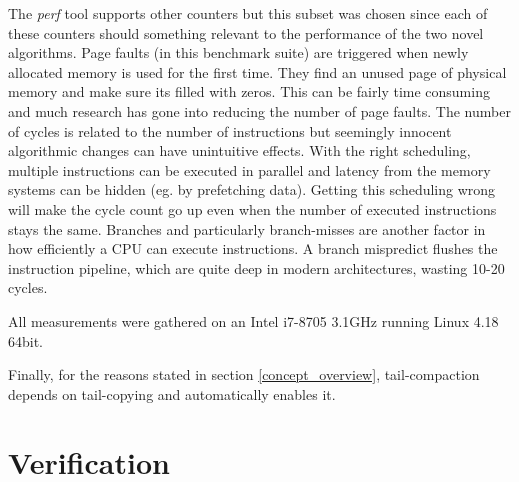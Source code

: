 \documentclass[a4paper,oneside]{memoir}
\begin{document}
The \emph{perf} tool supports other counters but this subset was chosen since
each of these counters should something relevant to the performance of the two
novel algorithms. Page faults (in this benchmark suite) are triggered when newly
allocated memory is used for the first time. They find an unused page of physical
memory and make sure its filled with zeros. This can be fairly time consuming
and much research has gone into reducing the number of page faults.\cite{Nakashima:1995,Chase:1987,Moon:1984,Grunwald:1993}
The number of cycles is related to the number of instructions but seemingly
innocent algorithmic changes can have unintuitive effects. With the right
scheduling, multiple instructions can be executed in parallel and latency from
the memory systems can be hidden (eg. by prefetching data). Getting this scheduling
wrong will make the cycle count go up even when the number of executed instructions
stays the same. Branches and particularly branch-misses are another factor in
how efficiently a CPU can execute instructions. A branch mispredict flushes the
instruction pipeline, which are quite deep in modern architectures, wasting
10-20 cycles.\cite{Drepper}

All measurements were gathered on an Intel i7-8705 3.1GHz running Linux 4.18 64bit.

Finally, for the reasons stated in section \ref{concept_overview}, tail-compaction
depends on tail-copying and automatically enables it.

\section{Verification}
\end{document}
